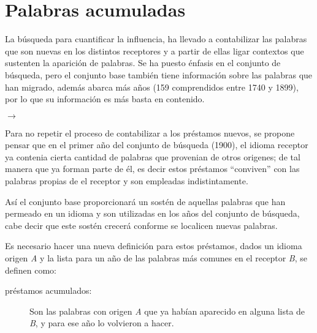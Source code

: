 \chapter{Palabras acumuladas}

La búsqueda para cuantificar la influencia, ha llevado a contabilizar las
palabras que son nuevas en los distintos receptores y a partir de ellas ligar contextos que sustenten la aparición de palabras.  Se ha puesto énfasis en el conjunto de búsqueda, pero  el conjunto base  también tiene información sobre las palabras que han migrado, además  abarca más años (159 comprendidos entre 1740 y 1899), por lo que su información es más basta en contenido. 
  

$\rightarrow$ 


Para no repetir el proceso de contabilizar a los préstamos nuevos,  se propone pensar que en el primer año del conjunto de búsqueda (1900), el idioma receptor ya contenia  cierta cantidad de palabras que provenian de otros origenes; 
de tal manera que  ya forman parte de él, es decir estos préstamos ``conviven'' con las palabras propias de el receptor y son empleadas
indistintamente.


Así el conjunto base proporcionará un sostén de aquellas palabras que han permeado en un idioma
y son utilizadas en los años del conjunto de búsqueda,  cabe decir que este
sostén crecerá conforme se localicen nuevas palabras. 

Es necesario hacer una nueva definición para estos préstamos, dados un idioma  origen  \textit{A} y la lista para un año  de las palabras más comunes en el receptor \textit{B}, se definen como: 

\begin{description}
	\item[préstamos acumulados:] Son las palabras con origen \textit{A} que ya habían aparecido en alguna lista de \textit{B}, y para ese año lo volvieron a hacer.  
\end{description}

